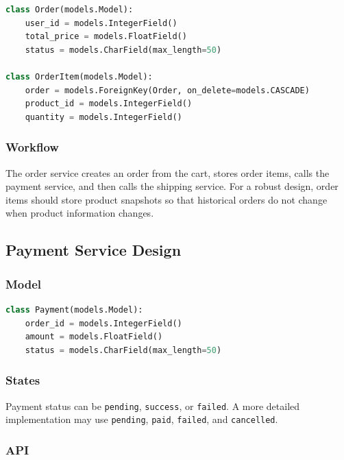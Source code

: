 \documentclass[12pt,a4paper]{article}
\newcommand{\codepath}[1]{\texttt{#1}}
\begin{document}
\begin{lstlisting}[language=Python,caption={Order service model.}]
class Order(models.Model):
    user_id = models.IntegerField()
    total_price = models.FloatField()
    status = models.CharField(max_length=50)

class OrderItem(models.Model):
    order = models.ForeignKey(Order, on_delete=models.CASCADE)
    product_id = models.IntegerField()
    quantity = models.IntegerField()
\end{lstlisting}

\subsubsection{Workflow}

The order service creates an order from the cart, stores order items, calls the payment service, and then calls the shipping service. For a robust design, order items should store product snapshots so that historical orders do not change when product information changes.

\subsection{Payment Service Design}

\subsubsection{Model}

\begin{lstlisting}[language=Python,caption={Payment service model.}]
class Payment(models.Model):
    order_id = models.IntegerField()
    amount = models.FloatField()
    status = models.CharField(max_length=50)
\end{lstlisting}

\subsubsection{States}

Payment status can be \codepath{pending}, \codepath{success}, or \codepath{failed}. A more detailed implementation may use \codepath{pending}, \codepath{paid}, \codepath{failed}, and \codepath{cancelled}.

\subsubsection{API}
\end{document}
